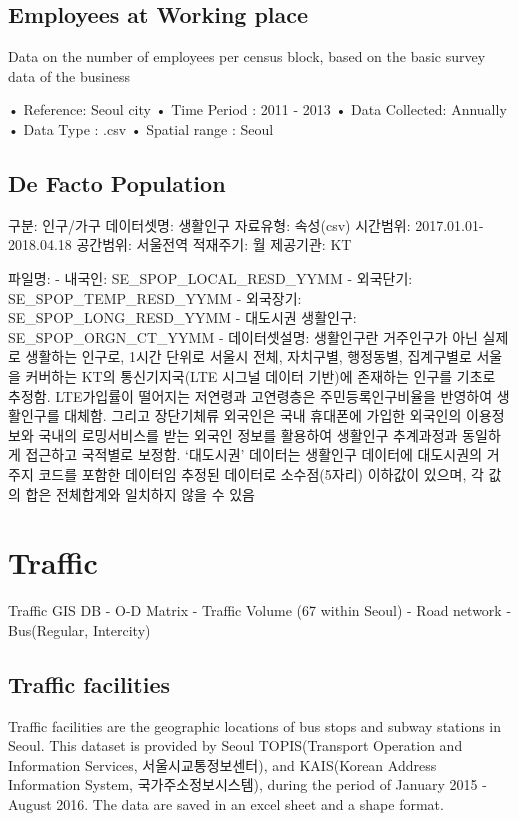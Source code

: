 \documentclass[]{book}
\begin{document}
\section{Employees at Working place}\label{employees-at-working-place}

Data on the number of employees per census block, based on the basic
survey data of the business

• Reference: Seoul city • Time Period : 2011 - 2013 • Data Collected:
Annually • Data Type : .csv • Spatial range : Seoul

\section{De Facto Population}\label{de-facto-population}

구분: 인구/가구 데이터셋명: 생활인구 자료유형: 속성(csv) 시간범위:
2017.01.01-2018.04.18 공간범위: 서울전역 적재주기: 월 제공기관: KT

파일명: - 내국인: SE\_SPOP\_LOCAL\_RESD\_YYMM - 외국단기:
SE\_SPOP\_TEMP\_RESD\_YYMM - 외국장기: SE\_SPOP\_LONG\_RESD\_YYMM -
대도시권 생활인구: SE\_SPOP\_ORGN\_CT\_YYMM - 데이터셋설명: 생활인구란
거주인구가 아닌 실제로 생활하는 인구로, 1시간 단위로 서울시 전체,
자치구별, 행정동별, 집계구별로 서울을 커버하는 KT의 통신기지국(LTE
시그널 데이터 기반)에 존재하는 인구를 기초로 추정함. LTE가입률이
떨어지는 저연령과 고연령층은 주민등록인구비율을 반영하여 생활인구를
대체함. 그리고 장단기체류 외국인은 국내 휴대폰에 가입한 외국인의
이용정보와 국내의 로밍서비스를 받는 외국인 정보를 활용하여 생활인구
추계과정과 동일하게 접근하고 국적별로 보정함. `대도시권' 데이터는
생활인구 데이터에 대도시권의 거주지 코드를 포함한 데이터임 추정된
데이터로 소수점(5자리) 이하값이 있으며, 각 값의 합은 전체합계와 일치하지
않을 수 있음

\chapter{Traffic}\label{traffic}

Traffic GIS DB - O-D Matrix - Traffic Volume (67 within Seoul) - Road
network - Bus(Regular, Intercity)

\section{Traffic facilities}\label{traffic-facilities}

Traffic facilities are the geographic locations of bus stops and subway
stations in Seoul. This dataset is provided by Seoul TOPIS(Transport
Operation and Information Services, 서울시교통정보센터), and KAIS(Korean
Address Information System, 국가주소정보시스템), during the period of
January 2015 - August 2016. The data are saved in an excel sheet and a
shape format.
\end{document}

